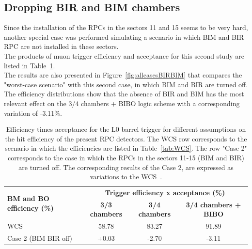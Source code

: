 \FloatBarrier
\subsection{Dropping BIR and BIM chambers}
\label{sec:BIRBIM_drop}
Since the installation of the RPCs in the sectors 11 and 15  seems to be very hard, another special case was performed simulating a scenario in which BIM and BIR RPC are not installed in these sectors.\\
The products of muon trigger efficiency and acceptance for this second study are listed in Table~\ref{tab:allcasesBIRBIM}.\\
The results are also presented in Figure~\ref{fig:allcasesBIRBIM} that compares the "worst-case scenario" with this second case, in which BIM and BIR are turned off.
The efficiency distributions show that the absence of BIR and BIM has the most relevant effect on the 3/4 chambers + BIBO logic scheme with a corresponding variation of -3.11\%.

\begin{table}[h]
	\begin{center}
		\small
		\begin{tabular}{l|c|c|c}
			\hline
			\multirow{2}{*}{\textbf{BM and BO efficiency (\%)}} & \multicolumn{3}{c}{\textbf{Trigger efficiency x acceptance (\%)}}\\
			\cline{2-4}   
			& \textbf{3/3 chambers} & \textbf{3/4 chambers} & \textbf{3/4 chambers + BIBO}\\
			\hline 
			WCS 												& 58.78 				& 83.27 				& 91.89\\
			Case 2  (BIM BIR off)								& +0.03 			   	& -2.70 				& -3.11\\
			\hline 
		\end{tabular} 
		\caption{Efficiency times acceptance for the L0 barrel trigger for different assumptions on the hit efficiency of the present RPC detectors. The WCS row corresponds to the scenario in which the efficiencies are listed in Table~\ref{tab:WCS}. The row "Case 2" corresponds to the case in which the RPCs in the sectors 11-15 (BIM and BIR) are turned off. The corresponding results of the Case 2, are expressed as variations to the WCS~\cite{Marcoccia:2693982}.} 
		\label{tab:allcasesBIRBIM}
	\end{center} 
\end{table} 

